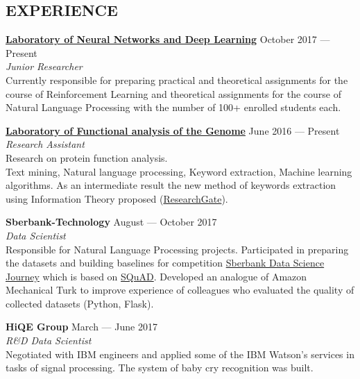 \documentclass[margin, 9pt]{res} %
\begin{document}
\begin{resume}


\section{EXPERIENCE}

\textbf{\href{https://www.facebook.com/deepmipt/}{Laboratory of Neural Networks and Deep Learning}} \hfill October 2017 --- Present \\
{\sl Junior Researcher} \\
Currently responsible for preparing practical and theoretical assignments for the course of Reinforcement Learning and theoretical assignments for the course of Natural Language Processing with the number of 100+ enrolled students each.

\textbf{\href{http://www.generesearch.ru/Members.html}{Laboratory of Functional analysis of the Genome}} \hfill June 2016 --- Present \\
{\sl Research Assistant} \\
Research on protein function analysis.\\
Text mining, Natural language processing, Keyword extraction, Machine learning algorithms. As an intermediate result the new method of keywords extraction using Information Theory proposed (\href{https://www.researchgate.net/publication/319631846_Advanced_Parser_for_Biomedical_Texts_Poster_for_MCCMB\%2717}{ResearchGate}).

\textbf{Sberbank-Technology} \hfill August --- October 2017 \\
{\sl Data Scientist} \\
Responsible for Natural Language Processing projects. Participated in preparing the datasets and building baselines for competition \href{https://www.sdsj.ru/en/contest.html}{Sberbank Data Science Journey} which is based on \href{https://rajpurkar.github.io/SQuAD-explorer/}{SQuAD}. Developed an analogue of Amazon Mechanical Turk to improve experience of colleagues who evaluated the quality of collected datasets (Python, Flask).

\textbf{HiQE Group} \hfill March --- June 2017 \\
{\sl R\&D Data Scientist} \\
Negotiated with IBM engineers and applied some of the IBM Watson's services in tasks of signal processing. The system of baby cry recognition was built.


\end{resume}
\end{document}
